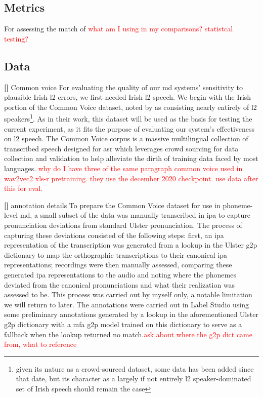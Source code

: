 \documentclass[thesis]{cluu}
\newcounter{paranum}
\newcommand{\numberedparagraph}{\par\refstepcounter{paranum}\textbf{[\theparanum] }}
\newcommand{\todo}[1]{\textcolor{red}{#1}}
\begin{document}
\subsection{Metrics}
For assessing the match of \todo{what am I using in my comparisons?}
\todo{statistcal testing?}

\subsection{Data}
\numberedparagraph{Common voice}
For evaluating the quality of our \gls{md} systems' sensitivity to plausible Irish \gls{l2} errors, we first needed Irish \gls{l2} speech. We begin with the Irish portion of the Common Voice dataset\textcite{ardilaCommonVoiceMassivelyMultilingual2020}, noted by \textcite{lonerganAutomaticSpeechRecognition} as consisting nearly entirely of \gls{l2} speakers\footnote{given its nature as a crowd-sourced dataset, some data has been added since that date, but its character as a largely if not entirely \gls{l2} speaker-dominated set of Irish speech should remain the case}. As in their work, this dataset will be used as the basis for testing the current experiment, as it fits the purpose of evaluating our system's effectiveness on \gls{l2} speech. The Common Voice corpus is a massive multilingual collection of transcribed speech designed for \gls{asr} which leverages crowd sourcing for data collection and validation to help alleviate the dirth of training data faced by most languages. \todo{why do I have three of the same paragraph} \todo{common voice used in wav2vec2 xls-r pretraining. they use the december 2020 checkpoint. use data after this for eval.}

\numberedparagraph{annotation details} 
To prepare the Common Voice dataset for use in phoneme-level \gls{md}, a small subset of the data was manually transcribed in \gls{ipa} to capture pronunciation deviations from standard Ulster pronunciation. The process of capturing these deviations consisted of the following steps: first, an \gls{ipa} representation of the transcription was generated from a lookup in the Ulster \gls{g2p} dictionary to map the orthographic transcriptions to their canonical \gls{ipa} representations; recordings were then manually assessed, comparing these generated \gls{ipa} representations to the audio and noting where the phonemes deviated from the canonical pronunciations and what their realization was assessed to be. This process was carried out by myself only, a notable limitation we will return to later. The annotations were carried out in Label Studio using some preliminary annotations generated by a lookup in the aforementioned Ulster \gls{g2p} dictionary with a \gls{mfa} \gls{g2p} model trained on this dictionary to serve as a fallback when the lookup returned no match.\todo{ask about where the g2p dict came from, what to reference}
\end{document}
